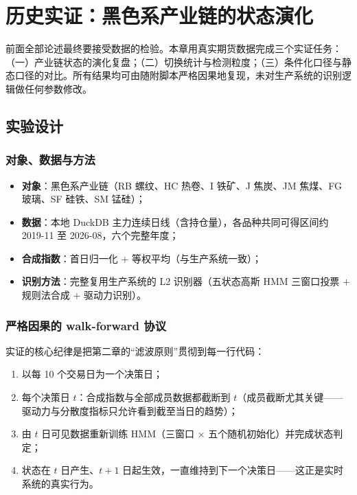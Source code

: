 
\section{历史实证：黑色系产业链的状态演化}
\label{sec:empirical}

前面全部论述最终要接受数据的检验。本章用真实期货数据完成三个实证任务：（一）产业链状态的演化复盘；（二）切换统计与检测粒度；（三）条件化口径与静态口径的对比。所有结果均可由随附脚本严格因果地复现，未对生产系统的识别逻辑做任何参数修改。

\subsection{实验设计}

\subsubsection{对象、数据与方法}

\begin{itemize}[itemsep=2pt]
\item \textbf{对象}：黑色系产业链（RB 螺纹、HC 热卷、I 铁矿、J 焦炭、JM 焦煤、FG 玻璃、SF 硅铁、SM 锰硅）；
\item \textbf{数据}：本地 DuckDB 主力连续日线（含持仓量），各品种共同可得区间约 2019-11 至 2026-08，六个完整年度；
\item \textbf{合成指数}：首日归一化 $+$ 等权平均（与生产系统一致）；
\item \textbf{识别方法}：完整复用生产系统的 L2 识别器（五状态高斯 HMM 三窗口投票 $+$ 规则法合成 $+$ 驱动力识别）。
\end{itemize}

\subsubsection{严格因果的 walk-forward 协议}

实证的核心纪律是把第二章的“滤波原则”贯彻到每一行代码：

\begin{enumerate}[itemsep=2pt]
\item 以每 10 个交易日为一个决策日；
\item 每个决策日 $t$：合成指数与全部成员数据都截断到 $t$（成员截断尤其关键——驱动力与分散度指标只允许看到截至当日的趋势）；
\item 由 $t$ 日可见数据重新训练 HMM（三窗口 $\times$ 五个随机初始化）并完成状态判定；
\item 状态在 $t$ 日产生、$t+1$ 日起生效，一直维持到下一个决策日——这正是实时系统的真实行为。
\end{enumerate}

